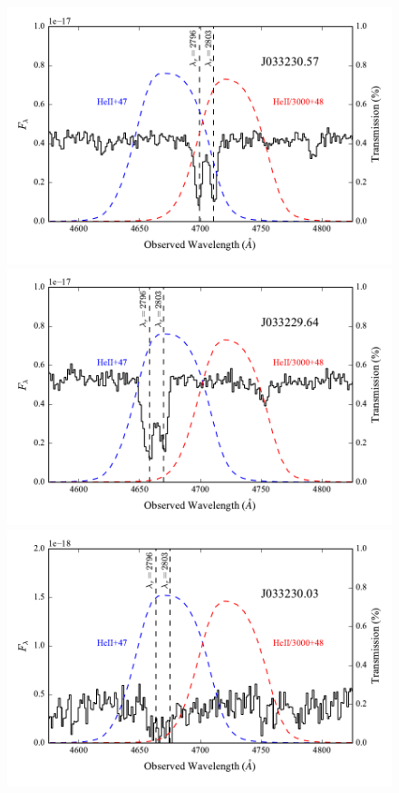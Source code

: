 \documentclass[twocolumn]{aastex6}
\begin{document}
\begin{figure}[!htb]
\centering
\includegraphics[scale=0.58]{../Figures/filt_57_spectra.pdf}
\includegraphics[scale=0.58]{../Figures/filt_64_spectra.pdf}
\includegraphics[scale=0.58]{../Figures/filt_03_spectra.pdf}

\end{figure}
\end{document}
